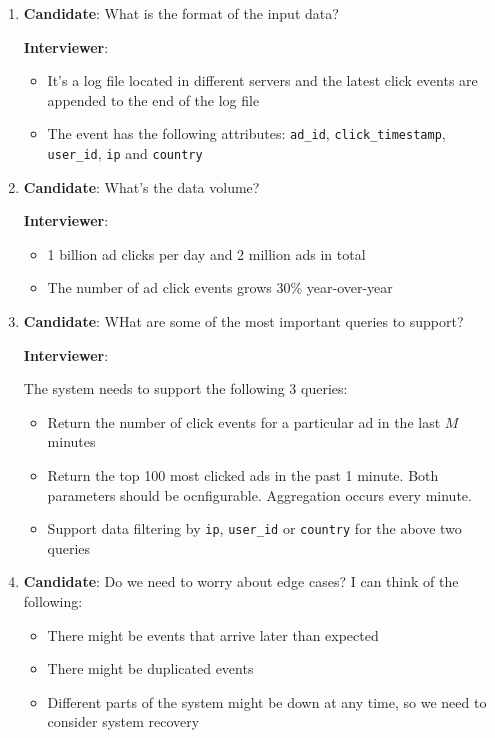 \documentclass{report}
\theoremstyle{definition}
\begin{document}
\begin{enumerate}
\item

\textbf{Candidate}: What is the format of the input data?

\textbf{Interviewer}:

\begin{itemize}
\item
It's a log file located in different servers and the latest click events are appended to the end of the log file
\item
The event has the following attributes: \lstinline|ad_id|, \lstinline|click_timestamp|, \lstinline|user_id|, \lstinline|ip| and \lstinline|country|
\end{itemize}

\item
\textbf{Candidate}: What's the data volume?

\textbf{Interviewer}:

\begin{itemize}
\item
1 billion ad clicks per day and 2 million ads in total
\item
The number of ad click events grows 30\% year-over-year
\end{itemize}

\item
\textbf{Candidate}: WHat are some of the most important queries to support?

\textbf{Interviewer}:

The system  needs to support the following 3 queries:
\begin{itemize}
\item
Return the number of click events for a particular ad in the last $M$ minutes
\item
Return the top 100 most clicked ads in the past 1 minute. Both parameters should be ocnfigurable. Aggregation occurs every minute.
\item
Support data filtering by \lstinline|ip|, \lstinline|user_id| or \lstinline|country| for the above two queries
\end{itemize}

\item

\textbf{Candidate}: Do we need to worry about edge cases? I can think of the following:

\begin{itemize}
\item
There might be events that arrive later than expected
\item
There might be duplicated events
\item
Different parts of the system might be down at any time, so we need to consider system recovery
\end{itemize}


\end{enumerate}
\end{document}
